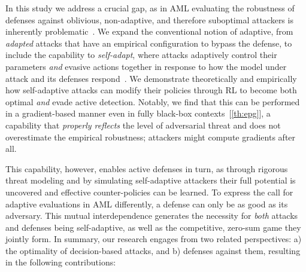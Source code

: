 In this study we address a crucial gap, as in \gls{AML} evaluating the robustness of defenses against oblivious, non-adaptive, and therefore suboptimal attackers is inherently problematic~\cite{tramer2020adaptive,croce2020reliable}.
We expand the conventional notion of adaptive, from \emph{adapted} attacks that have an empirical configuration to bypass the defense, to include the capability to \emph{self-adapt}, where attacks adaptively control their parameters \textit{and} evasive actions together in response to how the model under attack and its defenses respond~\cite{aastrom2013adaptive}.
We demonstrate theoretically and empirically how self-adaptive attacks can modify their policies through \gls{RL} to become both optimal \emph{and} evade active detection.
Notably, we find that this can be performed in a gradient-based manner even in fully black-box contexts~[\ref{th:epg}], a capability that \emph{properly reflects} the level of adversarial threat and does not overestimate the empirical robustness; attackers might compute gradients after all.

This capability, however, enables active defenses in turn, as through rigorous threat modeling and by simulating self-adaptive attackers their full potential is uncovered and effective counter-policies can be learned.
To express the call for adaptive evaluations in \gls{AML} differently, a defense can only be as good as its adversary.
This mutual interdependence generates the necessity for \emph{both} attacks and defenses being self-adaptive, as well as the competitive, zero-sum game they jointly form.
In summary, our research engages from two related perspectives: a) the optimality of decision-based attacks, and b) defenses against them, resulting in the following contributions:

